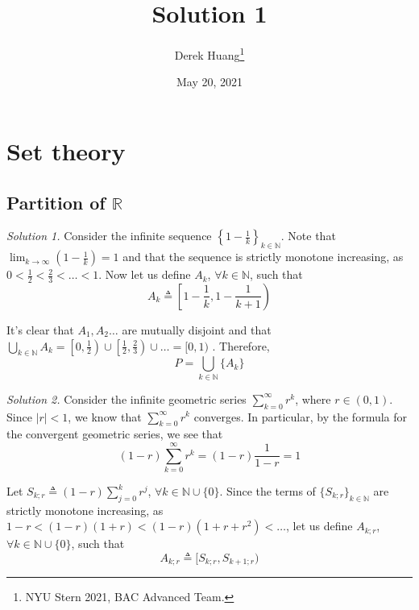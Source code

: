\documentclass{article}
\title{Solution 1}
\author{Derek Huang\thanks{NYU Stern 2021, BAC Advanced Team.}}
\date{May 20, 2021}
\numberwithin{equation}{section}
\begin{document}
\maketitle
\thispagestyle{fancy}

\section{Set theory}

\subsection{Partition of $ \mathbb{R} $}

\textit{Solution 1.} Consider the infinite sequence
$ \left\{1 - \frac{1}{k}\right\}_{k \in \mathbb{N}} $. Note that
$ \lim_{k \rightarrow \infty}\left(1 - \frac{1}{k}\right) = 1 $ and that the
sequence is strictly monotone increasing, as
$ 0 < \frac{1}{2} < \frac{2}{3} < \ldots < 1 $. Now let us define $ A_k $,
$ \forall k \in \mathbb{N} $, such that
\begin{equation*}
    A_k \triangleq \left[1 - \frac{1}{k}, 1 - \frac{1}{k + 1}\right)
\end{equation*}

It's clear that $ A_1, A_2 \ldots $ are mutually disjoint and that
$ \bigcup_{k \in \mathbb{N}}A_k = \left[0, \frac{1}{2}\right) \cup
\left[\frac{1}{2}, \frac{2}{3}\right) \cup \ldots = [0, 1) $ . Therefore,
\begin{equation*}
    P = \bigcup_{k \in \mathbb{N}}\{A_k\}
\end{equation*}

\medskip

\textit{Solution 2.} Consider the infinite geometric series
$ \sum_{k = 0}^\infty r^k $, where $ r \in (0, 1) $. Since $ |r| < 1 $, we
know that $ \sum_{k = 0}^\infty r^k $ converges. In particular, by the
formula for the convergent geometric series, we see that
\begin{equation*}
    (1 - r)\sum_{k = 0}^\infty r^k = (1 - r)\frac{1}{1 - r} = 1
\end{equation*}

Let $ S_{k; r} \triangleq (1 - r)\sum_{j = 0}^kr^j $,
$ \forall k \in \mathbb{N} \cup\{0\} $. Since the terms of
$ \{S_{k; r}\}_{k \in \mathbb{N}} $ are strictly monotone increasing, as
$ 1 - r < (1 - r)(1 + r) < (1 - r)(1 + r + r^2) < \ldots $, let us define
$ A_{k; r} $, $ \forall k \in \mathbb{N} \cup \{0\} $, such that
\begin{equation*}
    A_{k; r} \triangleq [S_{k; r}, S_{k + 1; r})
\end{equation*}
\end{document}
